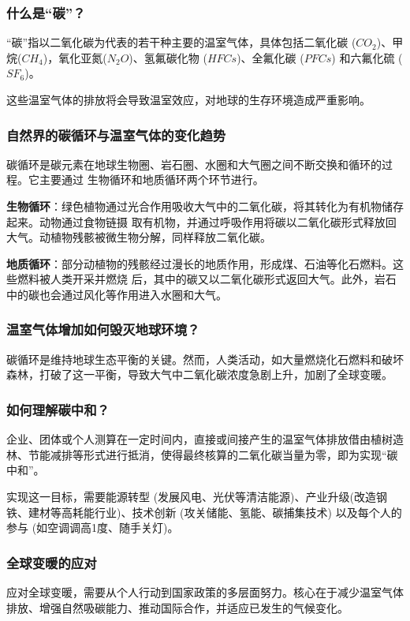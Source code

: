 \documentclass[12pt,a4paper]{article}
\begin{document}
	\subsubsection{什么是“碳”？}
	
	“碳”指以二氧化碳为代表的若干种主要的温室气体，具体包括二氧化碳 ($CO_2$)、甲烷($CH_4$)，氧化亚氮($N_2O$)、氢氟碳化物 ($HFCs$)、全氟化碳 ($PFCs$) 和六氟化硫 ($SF_6$)。
	
	这些温室气体的排放将会导致温室效应，对地球的生存环境造成严重影响。
	
	\subsubsection{自然界的碳循环与温室气体的变化趋势}
	
	碳循环是碳元素在地球生物圈、岩石圈、水圈和大气圈之间不断交换和循环的过程。它主要通过
	生物循环和地质循环两个环节进行。
	
	\textbf{生物循环}：绿色植物通过光合作用吸收大气中的二氧化碳，将其转化为有机物储存起来。动物通过食物链摄
	取有机物，并通过呼吸作用将碳以二氧化碳形式释放回大气。动植物残骸被微生物分解，同样释放二氧化碳。
	
	\textbf{地质循环}：部分动植物的残骸经过漫长的地质作用，形成煤、石油等化石燃料。这些燃料被人类开采并燃烧
	后，其中的碳又以二氧化碳形式返回大气。此外，岩石中的碳也会通过风化等作用进入水圈和大气。
	
	\subsubsection{温室气体增加如何毁灭地球环境？}
	碳循环是维持地球生态平衡的关键。然而，人类活动，如大量燃烧化石燃料和破坏
	森林，打破了这一平衡，导致大气中二氧化碳浓度急剧上升，加剧了全球变暖。
	
	\subsubsection{如何理解碳中和？}
	企业、团体或个人测算在一定时间内，直接或间接产生的温室气体排放借由植树造林、节能减排等形式进行抵消，使得最终核算的二氧化碳当量为零，即为实现“碳中和”。
	
	实现这一目标，需要能源转型 (发展风电、光伏等清洁能源)、产业升级(改造钢铁、建材等高耗能行业)、技术创新 (攻关储能、氢能、碳捕集技术) 以及每个人的参与 (如空调调高1度、随手关灯)。
	\subsubsection{全球变暖的应对}
	应对全球变暖，需要从个人行动到国家政策的多层面努力。核心在于减少温室气体排放、增强自然吸碳能力、推动国际合作，并适应已发生的气候变化。
	
\end{document}
